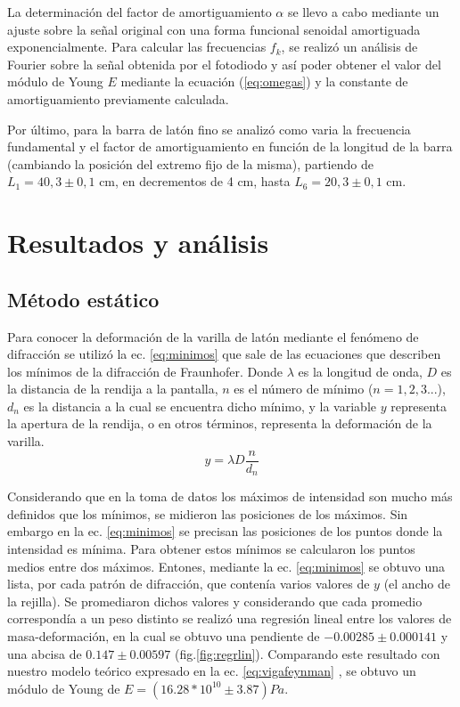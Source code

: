\documentclass[twoside,twocolumn,a4paper]{article}
\begin{document}
La determinaci\'on del factor de amortiguamiento $\alpha$ se llevo a cabo mediante un ajuste sobre la se\~nal original con una forma funcional senoidal amortiguada exponencialmente.
Para calcular las frecuencias $f_{k}$, se realiz\'o un an\'alisis de Fourier sobre la se\~nal obtenida por el fotodiodo y as\'i poder obtener el valor del m\'odulo de Young $E$ mediante la ecuaci\'on (\ref{eq:omegas}) y la constante de amortiguamiento previamente calculada.

Por \'ultimo, para la barra de lat\'on fino se analiz\'o como varia la frecuencia fundamental y el factor de amortiguamiento en funci\'on de la longitud de la barra (cambiando la posici\'on del extremo fijo de la misma), partiendo de $L_{1} = 40,3 \pm 0,1$ cm, en decrementos de 4 cm, hasta $L_{6} = 20,3 \pm 0,1$ cm.



\section{Resultados y an\'alisis}


\subsection{M\'etodo est\'atico}

Para conocer la deformaci\'on de la varilla de lat\'on mediante el fen\'omeno de difracci\'on se utiliz\'o la ec. \ref{eq:minimos} que sale de las ecuaciones que describen los m\'inimos de la  difracci\'on de  Fraunhofer. Donde $\lambda$  es la longitud de onda, $D$ es la distancia de la rendija a la pantalla,  $n$ es el n\'umero de m\'inimo ($n=1,2,3...$), $d_{n}$ es la distancia a la cual se encuentra dicho m\'inimo, y la variable $y$ representa la apertura de la rendija, o en otros t\'erminos, representa la deformaci\'on de la varilla. 
\begin{equation}
\label{eq:minimos}
y= \lambda D \frac{n}{d_{n}}
\end{equation}

Considerando que en la toma de datos los m\'aximos de intensidad son mucho m\'as definidos que los m\'inimos, se midieron las posiciones de los m\'aximos. Sin embargo en la ec. \ref{eq:minimos} se precisan las posiciones de los puntos donde la intensidad es m\'inima. Para obtener estos m\'inimos se calcularon los puntos medios entre dos m\'aximos. Entones, mediante la ec. \ref{eq:minimos} se obtuvo una lista, por cada patr\'on de difracci\'on, que conten\'ia varios valores de $y$ (el ancho de la rejilla). Se promediaron dichos valores y considerando que cada promedio correspond\'ia a un peso distinto se realiz\'o una regresi\'on lineal entre los valores de masa-deformaci\'on, en la cual se obtuvo una pendiente de $-0.00285 \pm 0.000141 $ y una abcisa de $0.147 \pm 0.00597$ (fig.\ref{fig:regrlin}). Comparando este resultado con nuestro modelo te\'orico expresado en la ec. \ref{eq:vigafeynman} , se obtuvo un m\'odulo de Young de $E=(16.28 * 10^{10} \pm 3.87)Pa $.
\end{document}

